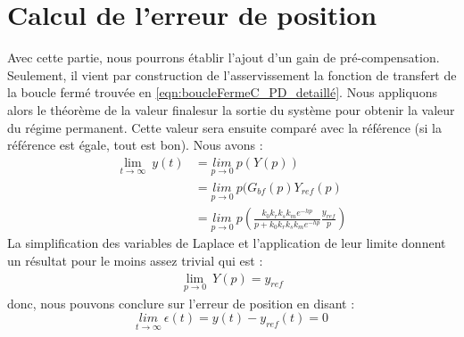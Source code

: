 \section{Calcul de l'erreur de position} 
Avec cette partie, nous pourrons établir l'ajout d'un gain de pré-compensation. Seulement, il vient par construction de l'asservissement la fonction de transfert de la boucle fermé trouvée en \ref{eqn:boucleFermeC_PD_detaillé}. Nous appliquons alors le théorème de la valeur finalesur la sortie du système pour obtenir la valeur du régime permanent. Cette valeur sera ensuite comparé avec la référence (si la référence est égale, tout est bon). Nous avons :
\begin{align*}
\underset{t\rightarrow \infty}{\lim}\ y(t) 	&= \underset{ p\rightarrow 0 }{lim} \ p(Y(p))\\
  											&= \underset{p\rightarrow 0}{lim}\ p(G_{bf}(p)Y_{ref}(p)\\
  											&= \underset{p\rightarrow 0}{lim}\ p \left(\frac{k_0k_rk_sk_me^{-hp}}{p+k_0k_rk_sk_me^{-hp}} \frac{y_{ref}}{p}\right)
\end{align*}
La simplification des variables de Laplace et l'application de leur limite donnent un résultat pour le moins assez trivial qui est :
\begin{align*}
\underset{p\rightarrow 0}{\lim}\ Y(p) = y_{ref}
\end{align*}
donc, nous pouvons conclure sur l'erreur de position en disant : 
\begin{equation}
\underset{t \rightarrow \infty}{lim}\ \epsilon(t) = y(t) - y_{ref}(t) = 0
\end{equation}

